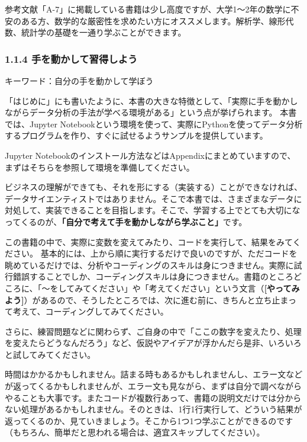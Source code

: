 \documentclass[11pt]{article}
\begin{document}
    参考文献「A-7」に掲載している書籍は少し高度ですが、大学1～2年の数学に不安のある方、数学的な厳密性を求めたい方にオススメします。解析学、線形代数、統計学の基礎を一通り学ぶことができます。

    \subsubsection{1.1.4
手を動かして習得しよう}\label{ux624bux3092ux52d5ux304bux3057ux3066ux7fd2ux5f97ux3057ux3088ux3046}

キーワード：自分の手を動かして学ぼう

    「はじめに」にも書いたように、本書の大きな特徴として、「実際に手を動かしながらデータ分析の手法が学べる環境がある」という点が挙げられます。
本書では、Jupyter
Notebookという環境を使って、実際にPythonを使ってデータ分析するプログラムを作り、すぐに試せるようサンプルを提供しています。

Jupyter
Notebookのインストール方法などはAppendixにまとめていますので、まずはそちらを参照して環境を準備してください。

ビジネスの理解ができても、それを形にする（実装する）ことができなければ、データサイエンティストではありません。そこで本書では、さまざまなデータに対処して、実装できることを目指します。そこで、学習する上でとても大切になってくるのが、\textbf{「自分で考えて手を動かしながら学ぶこと」}です。

この書籍の中で、実際に変数を変えてみたり、コードを実行して、結果をみてください。
基本的には、上から順に実行するだけで良いのですが、ただコードを眺めているだけでは、分析やコーディングのスキルは身につきません。実際に試行錯誤することでしか、コーディングスキルは身につきません。書籍のところどころに、「〜をしてみてください」や「考えてください」という文言（\textbf{{[}やってみよう{]}}）があるので、そうしたところでは、次に進む前に、きちんと立ち止まって考えて、コーディングしてみてください。

さらに、練習問題などに関わらず、ご自身の中で「ここの数字を変えたり、処理を変えたらどうなんだろう」など、仮説やアイデアが浮かんだら是非、いろいろと試してみてください。

時間はかかるかもしれません。詰まる時もあるかもしれませんし、エラー文などが返ってくるかもしれませんが、エラー文も見ながら、まずは自分で調べながらやることも大事です。またコードが複数行あって、書籍の説明文だけでは分からない処理があるかもしれません。そのときは、1行1行実行して、どういう結果が返ってくるのか、見ていきましょう。そこから1つ1つ学ぶことができるのです（もちろん、簡単だと思われる場合は、適宜スキップしてください）。
\end{document}
